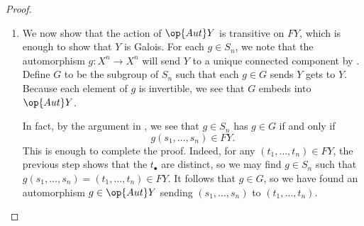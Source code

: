 \documentclass{amsart}
\begin{document}
\begin{proof}
\begin{enumerate}
        \item We now show that the action of $\op{Aut}Y$ is transitive on $FY$, which is enough to show that $Y$ is Galois. For each $g\in S_n$, we note that the automorphism $g\colon X^n\to X^n$ will send $Y$ to a unique connected component by . Define $G$ to be the subgroup of $S_n$ such that each $g\in G$ sends $Y$ gets to $Y$. Because each element of $g$ is invertible, we see that $G$ embeds into $\op{Aut}Y$.

        In fact, by the argument in , we see that $g\in S_n$ has $g\in G$ if and only if
        \[g(s_1,\ldots,s_n)\in FY.\]
        This is enough to complete the proof. Indeed, for any $(t_1,\ldots,t_n)\in FY$, the previous step shows that the $t_\bullet$ are distinct, so we may find $g\in S_n$ such that $g(s_1,\ldots,s_n)=(t_1,\ldots,t_n)\in FY$. It follows that $g\in G$, so we have found an automorphism $g\in\op{Aut}Y$ sending $(s_1,\ldots,s_n)$ to $(t_1,\ldots,t_n)$.
        \qedhere
    \end{enumerate}
\end{proof}
\end{document}
